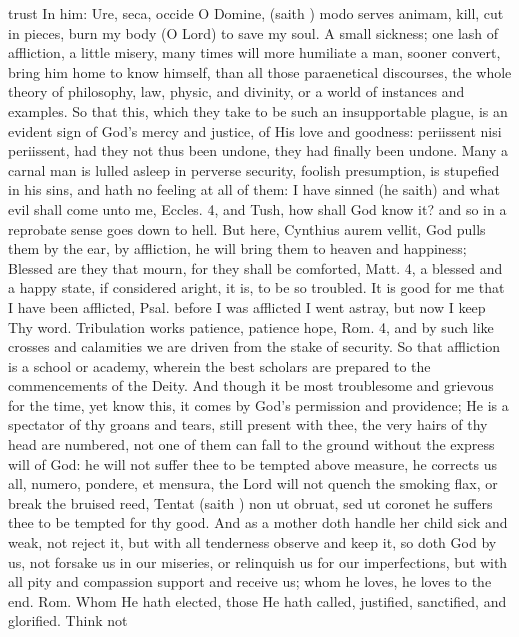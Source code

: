 {trust In him: Ure, seca, occide O Domine, (saith \Austin{}) modo serves
animam, kill, cut in pieces, burn my body (O Lord) to save my soul. A
small sickness; one lash of affliction, a little misery, many times
will more humiliate a man, sooner convert, bring him home to know
himself, than all those paraenetical discourses, the whole theory of
philosophy, law, physic, and divinity, or a world of instances and
examples. So that this, which they take to be such an insupportable
plague, is an evident sign of God's mercy and justice, of His love and
goodness: periissent nisi periissent, had they not thus been undone,
they had finally been undone. Many a carnal man is lulled asleep in
perverse security, foolish presumption, is stupefied in his sins, and
hath no feeling at all of them: I have sinned (he saith) and what evil
shall come unto me, Eccles.  4, and Tush, how shall God know it? and
so in a reprobate sense goes down to hell. But here, Cynthius aurem
vellit, God pulls them by the ear, by affliction, he will bring them to
heaven and happiness; Blessed are they that mourn, for they shall be
comforted, Matt.  4, a blessed and a happy state, if considered
aright, it is, to be so troubled. It is good for me that I have been
afflicted, Psal.  before I was afflicted I went astray, but now I
keep Thy word. Tribulation works patience, patience hope, Rom.  4,
and by such like crosses and calamities we are driven from the stake of
security. So that affliction is a school or academy, wherein the best
scholars are prepared to the commencements of the Deity. And though it
be most troublesome and grievous for the time, yet know this, it comes
by God's permission and providence; He is a spectator of thy groans and
tears, still present with thee, the very hairs of thy head are
numbered, not one of them can fall to the ground without the express
will of God: he will not suffer thee to be tempted above measure, he
corrects us all, numero, pondere, et mensura, the Lord will not
quench the smoking flax, or break the bruised reed, Tentat (saith
\Austin{}) non ut obruat, sed ut coronet he suffers thee to be tempted for
thy good. And as a mother doth handle her child sick and weak, not
reject it, but with all tenderness observe and keep it, so doth God by
us, not forsake us in our miseries, or relinquish us for our
imperfections, but with all pity and compassion support and receive us;
whom he loves, he loves to the end. Rom.  Whom He hath elected,
those He hath called, justified, sanctified, and glorified. Think not
}
